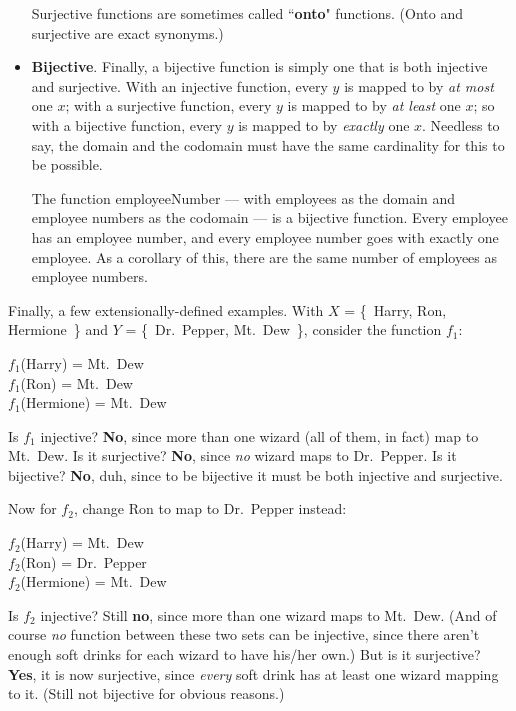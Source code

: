 \begin{itemize}
Surjective functions are sometimes called ``\textbf{onto}" functions.
(Onto and surjective are exact synonyms.)

\item \textbf{Bijective}. Finally, a bijective function is simply one that
is both injective and surjective. With an injective function, every $y$ is
mapped to by \textit{at most} one $x$; with a surjective function, every
$y$ is mapped to by \textit{at least} one $x$; so with a bijective
function, every $y$ is mapped to by \textit{exactly} one $x$. Needless to
say, the domain and the codomain must have the same cardinality for this to
be possible.

The function employeeNumber --- with employees as the domain and employee
numbers as the codomain --- is a bijective function. Every employee has an
employee number, and every employee number goes with exactly one employee.
As a corollary of this, there are the same number of employees as employee
numbers.

\end{itemize}

Finally, a few extensionally-defined examples. With $X$ = \{~Harry, Ron,
Hermione~\} and $Y$ = \{~Dr.~Pepper, Mt.~Dew~\}, consider the function
$f_1$:

\begin{center}
$f_1$(Harry) = Mt.~Dew \\
$f_1$(Ron) = Mt.~Dew \\
$f_1$(Hermione) = Mt.~Dew
\end{center}

Is $f_1$ injective? \textbf{No}, since more than one wizard (all of them,
in fact) map to Mt.~Dew. Is it surjective? \textbf{No}, since \textit{no}
wizard maps to Dr.~Pepper. Is it bijective? \textbf{No}, duh, since
to be bijective it must be both injective and surjective.

Now for $f_2$, change Ron to map to Dr.~Pepper instead:

\begin{center}
$f_2$(Harry) = Mt.~Dew \\
$f_2$(Ron) = Dr.~Pepper \\
$f_2$(Hermione) = Mt.~Dew
\end{center}

Is $f_2$ injective? Still \textbf{no}, since more than one wizard maps to
Mt.~Dew. (And of course \textit{no} function between these two sets can be
injective, since there aren't enough soft drinks for each wizard to have
his/her own.) But is it surjective?  \textbf{Yes}, it is now surjective, since
\textit{every} soft drink has at least one wizard mapping to it. (Still not
bijective for obvious reasons.)

